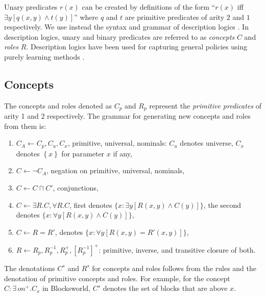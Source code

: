 \documentclass[letterpaper]{article} %
\newcommand{\set}[1]{\ensuremath{\left\{#1 \right\}}}
\begin{document}
Unary predicates $r(x)$ can be created by definitions of the form ``$r(x)$ iff $\exists y[q(x,y) \land t(y)]$''
where $q$ and $t$ are  primitive  predicates of arity $2$ and $1$ respectively.
We  use   instead the syntax and  grammar
of  description logics \cite{dl-handbook}.  In description logics, unary and binary predicates
are referred to as \emph{concepts} $C$  and \emph{roles} $R$. Description logics  have been used
for capturing general policies using purely learning methods \cite{martin-geffner:generalized,fern:bias}.

\subsection{Concepts}

The concepts and roles denoted as $C_p$ and $R_p$ represent the \emph{primitive predicates} of arity 1 and 2 respectively.
The grammar for generating new concepts and roles from them is:

\begin{enumerate}[{\small$\bullet$}]
  \item $C_A \leftarrow C_p, C_u, C_x$,  primitive, universal, nominals: $C_u$ denotes  universe,
   $C_x$ denotes $\set{x}$ for parameter $x$ if any,
  \item $C \leftarrow \neg C_A$, negation on primitive, universal, nominals,
  \item $C \leftarrow C \sqcap C'$, conjunctions,
  \item $C \leftarrow \exists R.C,\forall R.C$, first denotes $\{x:\!\exists y[R(x,y) \land C(y)]\}$, %
    the second denotes $\{x:\forall y[R(x,y)\land C(y)]\}$, %
  \item $C \leftarrow R=R'$, denotes $\{ x : \forall y[R(x,y)=R'(x,y)]\}$, %
  \item $R \leftarrow R_p, R_p^{-1}, R_p^+, [R_p^{-1}]^+$: primitive, inverse, and transitive closure of both.
 \end{enumerate}

The denotations $C^s$ and $R^s$ for concepts and roles follows
from the rules and the denotation of primitive concepts and roles.
For example, for the concept $C: \exists\, on^+ . C_x$ in Blocksworld,
$C^s$ denotes the set of blocks that are above $x$.
\end{document}
